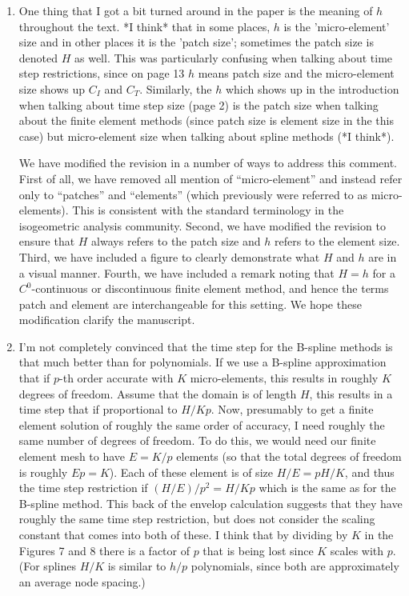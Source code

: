 \documentclass[10pt]{article}
\newcommand{\note}[1]{{\color{violet}#1}}
\begin{document}
\begin{enumerate}
\item One thing that I got a bit turned around in the paper is the meaning of $h$ throughout the text. *I think* that in some places, $h$ is the 'micro-element' size and in other places it is the 'patch size'; sometimes the patch size is denoted $H$ as well. This was particularly confusing when talking about time step restrictions, since on page 13 $h$ means patch size and the micro-element size shows up $C_{I}$ and $C_{T}$. Similarly, the $h$ which shows up in the introduction when talking about time step size (page 2) is the patch size when talking about the finite element methods (since patch size is element size in the this case) but micro-element size when talking about spline methods (*I think*).

\note{We have modified the revision in a number of ways to address this comment.  First of all, we have removed all mention of ``micro-element'' and instead refer only to ``patches'' and ``elements'' (which previously were referred to as micro-elements).  This is consistent with the standard terminology in the isogeometric analysis community.  Second, we have modified the revision to ensure that $H$ always refers to the patch size and $h$ refers to the element size.  Third, we have included a figure to clearly demonstrate what $H$ and $h$ are in a visual manner.  Fourth, we have included a remark noting that $H = h$ for a $C^0$-continuous or discontinuous finite element method, and hence the terms patch and element are interchangeable for this setting.  We hope these modification clarify the manuscript.  }

\item I'm not completely convinced that the time step for the B-spline methods is that much better than for polynomials. If we use a B-spline approximation that if $p$-th order accurate with $K$ micro-elements, this results in roughly $K$ degrees of freedom. Assume that the domain is of length $H$, this results in a time step that if proportional to $H / K p$. Now, presumably to get a finite element solution of roughly the same order of accuracy, I need roughly the same number of degrees of freedom. To do this, we would need our finite element mesh to have $E = K / p$ elements (so that the total degrees of freedom is roughly $E p = K$).  Each of these element is of size $H / E = p H / K$, and thus the time step restriction if $(H / E) / p^2 = H / K p$ which is the same as for the B-spline method. This back of the envelop calculation suggests that they have roughly the same time step restriction, but does not consider the scaling constant that comes into both of these. I think that by dividing by $K$ in the Figures 7 and 8 there is a factor of $p$ that is being lost since $K$ scales with $p$. (For splines $H / K$ is similar to $h / p$ polynomials, since both are approximately an average node spacing.)


\end{enumerate}
\end{document}
